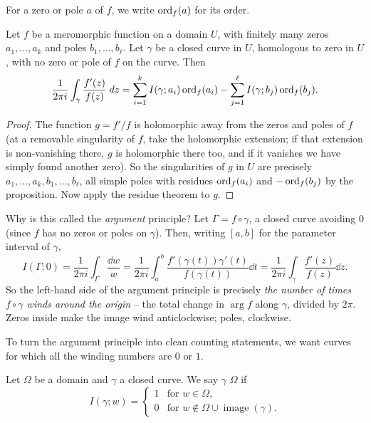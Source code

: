 \documentclass[a4paper]{scrartcl}
\begin{document}
\begin{definition}
    For a zero or pole $a$ of $f$, we write $\operatorname{ord}_f(a)$ for its order.
\end{definition}

\begin{theorem}
    Let $f$ be a meromorphic function on a domain $U$, with finitely many zeros $a_1, \dots, a_k$ and poles $b_1, \dots, b_\ell$. Let $\gamma$ be a closed curve in $U$, homologous to zero in $U$, with no zero or pole of $f$ on the curve. Then
    $$
    \frac{1}{2 \pi i} \int_\gamma \frac{f'(z)}{f(z)} \; d z = \sum_{i = 1}^{k} I(\gamma; a_i) \operatorname{ord}_f(a_i) - \sum_{j = 1}^{\ell} I(\gamma; b_j) \operatorname{ord}_f(b_j).
    $$
\end{theorem}
\begin{proof}
    The function $g = f'/f$ is holomorphic away from the zeros and poles of $f$ (at a removable singularity of $f$, take the holomorphic extension; if that extension is non-vanishing there, $g$ is holomorphic there too, and if it vanishes we have simply found another zero). So the singularities of $g$ in $U$ are precisely $a_1, \dots, a_k, b_1, \dots, b_\ell$, all simple poles with residues $\operatorname{ord}_f(a_i)$ and $-\operatorname{ord}_f(b_j)$ by the proposition. Now apply the residue theorem to $g$.
\end{proof}

Why is this called the \emph{argument} principle? Let $\Gamma = f \circ \gamma$, a closed curve avoiding $0$ (since $f$ has no zeros or poles on $\gamma$). Then, writing $[a, b]$ for the parameter interval of $\gamma$,
$$
I(\Gamma; 0) = \frac{1}{2 \pi i}\int_\Gamma \frac{\dd w}{w} = \frac{1}{2 \pi i} \int_a^b \frac{f'(\gamma(t)) \gamma'(t)}{f(\gamma(t))} \dd t = \frac{1}{2 \pi i}\int_\gamma \frac{f'(z)}{f(z)} \dd z.
$$
So the left-hand side of the argument principle is precisely \emph{the number of times $f \circ \gamma$ winds around the origin} -- the total change in $\arg f$ along $\gamma$, divided by $2\pi$. Zeros inside make the image wind anticlockwise; poles, clockwise.

To turn the argument principle into clean counting statements, we want curves for which all the winding numbers are $0$ or $1$.

\begin{definition}
    Let $\Omega$ be a domain and $\gamma$ a closed curve. We say $\gamma$  $\Omega$ if
    $$
    I(\gamma; w) = \begin{cases}
        1 &\mbox{for } w \in \Omega, \\
        0 &\mbox{for } w \notin \Omega \cup \operatorname{image}(\gamma).
       \end{cases}
    $$
\end{definition}
\end{document}
